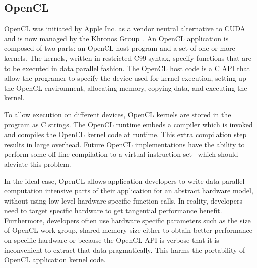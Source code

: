 
\subsection{OpenCL}

OpenCL was initiated by Apple Inc. as a vendor neutral alternative
to CUDA and is now managed by the Khronos Group~\cite{OpenCL_kh}.
An OpenCL application is composed of two parts: an OpenCL host program and a
set of one or more kernels. The kernels, written in restricted C99 syntax,
specify functions that are to be executed in data parallel fashion. The OpenCL 
host code is a C API that allow the programer to specify the device used for kernel execution, setting up the OpenCL environment, allocating memory, copying data, and executing the kernel.

To allow execution on different devices, OpenCL kernels are stored in
	the program as C strings.
The OpenCL runtime embeds a compiler which is invoked and compiles the OpenCL kernel code at runtime.
This extra compilation step results in large overhead. Future OpenCL implementations
 have the ability to perform some off line compilation to a virtual instruction
set~\cite{SPIR} which should aleviate this problem.

In the ideal case, OpenCL allows application developers to write
data parallel computation intensive parts of their application for an abstract
hardware model, without using low level hardware specific function calls.
In reality, developers need to target specific hardware to get tangential
performance benefit. Furthermore, developers often use hardware specific 
parameters such as the size of OpenCL work-group, shared memory size either 
to obtain better performance on specific hardware or because the OpenCL API
is verbose that it is inconvenient to extract that data pragmatically.
This harms the portability of OpenCL application kernel code.

